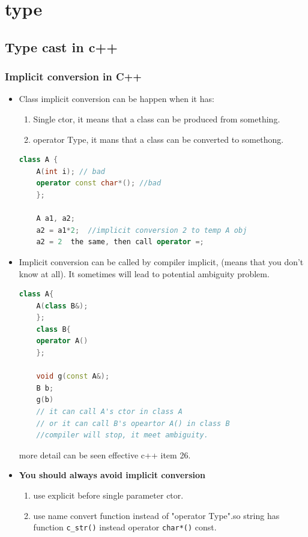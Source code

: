 \documentclass[a4paper,11pt,twoside]{book}
\begin{document}
\section{type}

\subsection{Type cast in c++}

\subsubsection{Implicit conversion in C++}
\begin{itemize}
	
	\item Class implicit conversion can be happen when it has:
	\begin{enumerate}
		\item Single ctor, it means that a class can be produced from something.
		\item operator Type, it mans that a class can be converted to somethong.
	\end{enumerate}
	
	\begin{lstlisting}[frame=single, language=c++]
	class A {
	A(int i); // bad
	operator const char*(); //bad
	};
	
	A a1, a2;
	a2 = a1*2;  //implicit conversion 2 to temp A obj
	a2 = 2  the same, then call operator =;
	\end{lstlisting}
	
	\item Implicit conversion can be called by compiler implicit, (means that you don't know at all). It sometimes will lead to potential ambiguity problem.
	\begin{lstlisting}[frame=single, language=c++]
	class A{
	A(class B&);
	};
	class B{
	operator A()
	};
	
	void g(const A&);
	B b;
	g(b)
	// it can call A's ctor in class A
	// or it can call B's opeartor A() in class B
	//compiler will stop, it meet ambiguity.
	\end{lstlisting}
	more detail can be seen effective c++ item 26.
	
	\item \textbf{You should always avoid implicit conversion}
	\begin{enumerate}
		\item use explicit before single parameter ctor.
		\item use name convert function instead of  "operator Type".so string has function \texttt{c\_str()} instead operator \texttt{char*()} const. 
	\end{enumerate}
	

\end{itemize}
\end{document}
